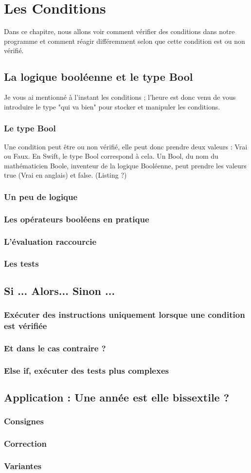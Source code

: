 \chapter{Les Conditions}
Dans ce chapitre, nous allons voir comment vérifier des conditions dans notre programme et
comment réagir différemment selon que cette condition est ou non vérifié.
\section{La logique booléenne et le type Bool}
Je vous ai mentionné à l'instant les conditions ; l'heure est donc venu de vous introduire le
type "qui va bien" pour stocker et manipuler les conditions.
\subsection{Le type Bool}
Une condition peut être ou non vérifié, elle peut donc prendre deux valeurs : Vrai ou Faux.
En Swift, le type Bool correspond à cela. Un Bool, du nom du mathématicien Boole,
inventeur de la logique Booléenne, peut prendre les valeurs true (Vrai en anglais) et false.
(Listing ?)
\subsection{Un peu de logique}
\subsection{Les opérateurs booléens en pratique}
\subsection{L'évaluation raccourcie}
\subsection{Les tests}
\section{Si ... Alors... Sinon ...}
\subsection{Exécuter des instructions uniquement lorsque une condition est vérifiée}

\subsection{Et dans le cas contraire ?}
\subsection{Else if, exécuter des tests plus complexes}
\section{Application : Une année est elle bissextile ?}
\subsection{Consignes}
\subsection{Correction}
\subsection{Variantes}

